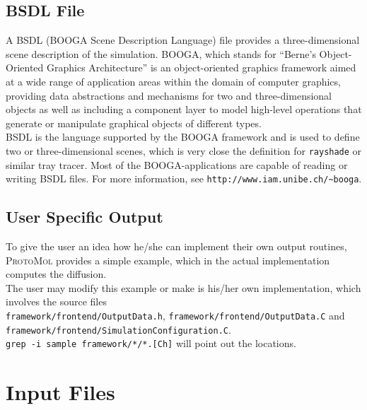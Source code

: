 \documentclass[11pt]{report}
\newcommand{\ProtoMol}{\textsc{ProtoMol }}
\providecommand{\ttsmall}[1]{\texttt{\small\mbox{#1}}}
\begin{document}
\subsection{BSDL File}

A BSDL (BOOGA Scene Description Language) file provides a
three-dimensional scene description of the simulation.  BOOGA, which
stands for ``Berne's Object-Oriented Graphics Architecture'' is an
object-oriented graphics framework aimed at a wide range of
application areas within the domain of computer graphics, providing
data abstractions and mechanisms for two and three-dimensional objects
as well as including a component layer to model high-level operations
that generate or manipulate graphical objects of different
types. ~\cite{BOOGA} \\

BSDL is the language supported by the BOOGA framework and is used to
define two or three-dimensional scenes, which is very close the
definition for \ttsmall{rayshade} or similar tray tracer. Most of the
BOOGA-applications are capable of reading or writing BSDL files.  For
more information, see \ttsmall{http://www.iam.unibe.ch/\~ { }booga}.

\subsection{User Specific Output}

To give the user an idea how he/she can implement their
own output routines, \ProtoMol provides a simple example, which in the
actual implementation computes the diffusion.\\

The user may modify this example or make is his/her own
implementation, which involves the source files\\
\ttsmall{framework/frontend/OutputData.h},
\ttsmall{framework/frontend/OutputData.C} and\\
\ttsmall{framework/frontend/SimulationConfiguration.C}.\\

\ttsmall{grep -i sample framework/*/*.[Ch]} will point out the locations.

\section{Input Files}
\end{document}
